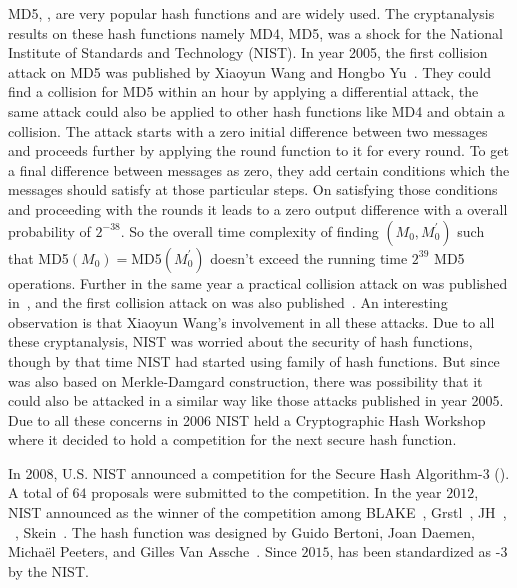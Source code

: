 MD5, ,  are very popular hash functions and are widely used. The cryptanalysis results on these hash functions namely MD4, MD5,  was a shock for the National Institute of Standards and Technology (NIST). In year 2005, the first collision attack on MD5 was published by Xiaoyun Wang and Hongbo Yu~\cite{wang2005break}. They could find a collision for MD5 within an hour by applying a differential attack, the same attack could also be applied to other hash functions like MD4 and obtain a collision. The attack starts with a zero initial difference between two messages and proceeds further by applying the round function to it for every round. To get a final difference between messages as zero, they add certain conditions which the messages should satisfy at those particular steps. On satisfying those conditions and proceeding with the rounds it leads to a zero output difference with a overall probability of $2^{-38}$. So the overall time complexity of finding $(M_0, M^\prime_0)$ such that MD5$(M_0) = $MD5$(M^\prime_0)$ doesn't exceed the running time $2^{39}$ MD5 operations. Further in the same year a practical collision attack on  was published in~\cite{wang2005efficient}, and the first collision attack on  was also published~\cite{wang2005finding}. An interesting observation is that Xiaoyun Wang's involvement in all these attacks. Due to all these cryptanalysis, NIST was worried about the security of hash functions, though by that time NIST had started using  family of hash functions. But since  was also based on Merkle-Damgard construction, there was possibility that it could also be attacked in a similar way like those attacks published in year 2005. Due to all these concerns in 2006 NIST held a Cryptographic Hash Workshop where it decided to hold a competition for the next secure hash function.

In 2008, U.S. NIST announced a competition for the Secure Hash Algorithm-3 (). A total of $64$ proposals were submitted to the competition. In the year $2012$, NIST announced \KECCAK{} as the winner of the competition among BLAKE~\cite{aumasson2008sha}, Grstl~\cite{gauravaram2011s}, JH~\cite{wu2011hash}, \KECCAK{}~\cite{bertonikeccak}, Skein~\cite{fergusonskein}. The \KECCAK{} hash function was designed by Guido Bertoni, Joan Daemen, Micha\"{e}l Peeters, and Gilles Van Assche~\cite{bertoni2009keccak}. Since $2015$, \KECCAK{} has been standardized as \SHA-$3$ by the NIST.

\section{\KECCAK{}}

